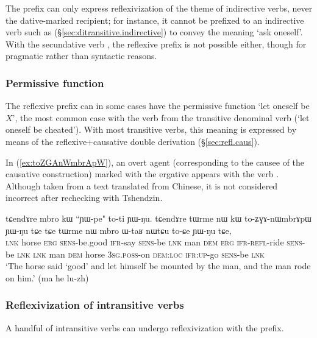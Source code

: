 The  prefix can only express reflexivization of the theme of indirective verbs, never the dative-marked recipient; for instance, it cannot be prefixed to an indirective verb such as  (§\ref{sec:ditransitive.indirective}) to convey the meaning `ask oneself'. With the secundative verb , the reflexive prefix is not possible either, though for pragmatic rather than syntactic reasons. 
   \subsubsection{Permissive function} \label{sec:refl.permissive}
The reflexive prefix can in some cases have the permissive function  `let oneself be $X$', the most common case with the verb  from the transitive denominal verb  (`let oneself be cheated'). With most transitive verbs, this meaning is expressed by means of the reflexive+causative double derivation (§\ref{sec:refl.caus}).

In (\ref{ex:toZGAnWmbrApW}), an overt agent (corresponding to the causee of the causative construction) marked with the ergative  appears with the verb . Although taken from a text translated from Chinese, it is not considered incorrect after rechecking with Tshendzin. 

 \begin{exe}
\ex \label{ex:toZGAnWmbrApW}
 \gll  tɕendɤre mbro kɯ ``ɲɯ-pe" to-ti ɲɯ-ŋu. tɕendɤre tɯrme nɯ kɯ to-ʑɣɤ-nɯmbrɤpɯ ɲɯ-ŋu tɕe tɕe tɯrme nɯ mbro ɯ-taʁ nɯtɕu to-ɕe ɲɯ-ŋu tɕe, \\
 \textsc{lnk} horse \textsc{erg} \textsc{sens}-be.good \textsc{ifr}-say \textsc{sens}-be \textsc{lnk}  man \textsc{dem} \textsc{erg} \textsc{ifr}-\textsc{refl}-ride \textsc{sens}-be \textsc{lnk} \textsc{lnk} man \textsc{dem} horse \textsc{3sg}.\textsc{poss}-on \textsc{dem}:\textsc{loc} \textsc{ifr}:\textsc{up}-go \textsc{sens}-be \textsc{lnk} \\
 \glt  `The horse said `good' and let himself be mounted by the man, and the man rode on him.'  (ma he lu-zh)
 \end{exe}


\subsubsection{Reflexivization of intransitive verbs} \label{sec:refl.intr}
A handful of intransitive verbs can undergo reflexivization with the  prefix.

